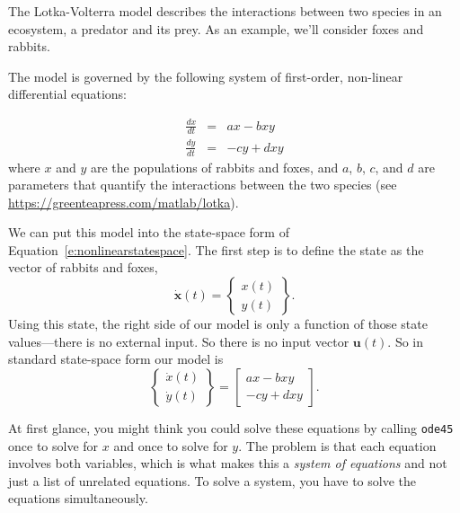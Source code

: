 \documentclass[../../book.tex]{subfiles}
\begin{document}
The Lotka-Volterra model describes the interactions between two
species in an ecosystem, a predator and its prey.  As an example, we'll consider foxes and rabbits.


The model is governed by the following system of first-order, non-linear differential equations:

\begin{eqnarray*}
    \frac{dx}{dt} &=& a x - b x y         \\
    \frac{dy}{dt} &=& -c y + d x y
\end{eqnarray*}
%
where $x$ and $y$ are the populations of rabbits and foxes,
and $a$, $b$, $c$, and $d$ are parameters
that quantify the interactions between the two species (see
\url{https://greenteapress.com/matlab/lotka}).

We can put this model into the state-space form of Equation~\ref{e:nonlinearstatespace}.  The first step is to define the state as the vector of rabbits and foxes,
\begin{equation*}
\dot{\mathbf{x}}(t)  = \left\{ \begin{array}{c}
     x(t) \\
     y(t)
\end{array}\right\}.
\end{equation*}
Using this state, the right side of our model is only a function of those state values---there is no external input.  So there is no input vector $\mathbf{u}(t)$.  So in standard state-space form our model is
\begin{equation*}
     \left\{ \begin{array}{c}
          \dot{x}(t) \\
          \dot{y}(t)
     \end{array}\right\} = 
     \left[  \begin{array}{c}
          ax - bxy \\
          -cy + dxy
     \end{array}\right].
     \end{equation*}

At first glance, you might think you could solve these equations by
calling \lstinline{ode45} once to solve for $x$ and
once to solve for $y$.  The problem is that each equation involves
both variables, which is what makes this a \emph{system of equations}
and not just a list of unrelated equations.  To solve a system, you
have  to solve the equations simultaneously.
\end{document}
